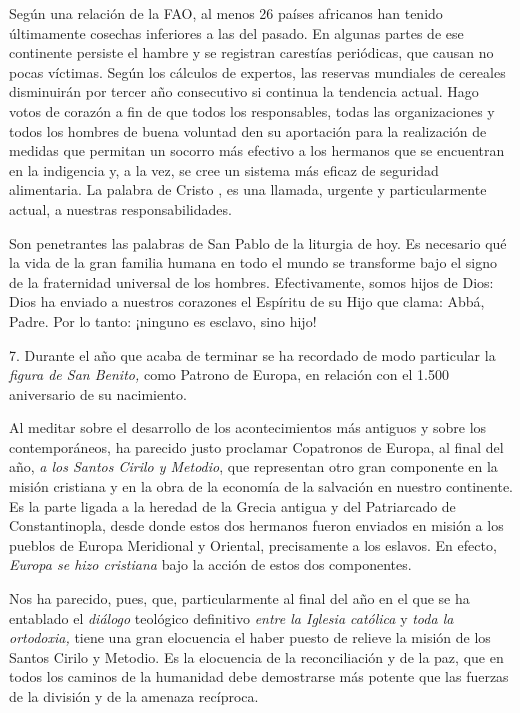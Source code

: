 Según una relación de la FAO, al menos 26 países africanos han tenido últimamente cosechas inferiores a las del pasado. En algunas partes de ese continente persiste el hambre y se registran carestías periódicas, que causan no pocas víctimas. Según los cálculos de expertos, las reservas mundiales de cereales disminuirán por tercer año consecutivo si continua la tendencia actual. Hago votos de corazón a fin de que todos los responsables, todas las organizaciones y todos los hombres de buena voluntad den su aportación para la realización de medidas que permitan un socorro más efectivo a los hermanos que se encuentran en la indigencia y, a la vez, se cree un sistema más eficaz de seguridad alimentaria. La palabra de Cristo , es una llamada, urgente y particularmente actual, a nuestras responsabilidades.

Son penetrantes las palabras de San Pablo de la liturgia de hoy. Es necesario qué la vida de la gran familia humana en todo el mundo se transforme bajo el signo de la fraternidad universal de los hombres. Efectivamente, somos hijos de Dios: Dios ha enviado a nuestros corazones el Espíritu de su Hijo que clama: Abbá, Padre. Por lo tanto: ¡ninguno es esclavo, sino hijo!

7. Durante el año que acaba de terminar se ha recordado de modo particular la \emph{figura de San Benito,} como Patrono de Europa, en relación con el 1.500 aniversario de su nacimiento.

Al meditar sobre el desarrollo de los acontecimientos más antiguos y sobre los contemporáneos, ha parecido justo proclamar Copatronos de Europa, al final del año, \emph{a los Santos Cirilo y Metodio}, que representan otro gran componente en la misión cristiana y en la obra de la economía de la salvación en nuestro continente. Es la parte ligada a la heredad de la Grecia antigua y del Patriarcado de Constantinopla, desde donde estos dos hermanos fueron enviados en misión a los pueblos de Europa Meridional y Oriental, precisamente a los eslavos. En efecto, \emph{Europa se hizo cristiana} bajo la acción de estos dos componentes.

Nos ha parecido, pues, que, particularmente al final del año en el que se ha entablado el \emph{diálogo} teológico definitivo \emph{entre la Iglesia católica} y \emph{toda la ortodoxia,} tiene una gran elocuencia el haber puesto de relieve la misión de los Santos Cirilo y Metodio. Es la elocuencia de la reconciliación y de la paz, que en todos los caminos de la humanidad debe demostrarse más potente que las fuerzas de la división y de la amenaza recíproca.

